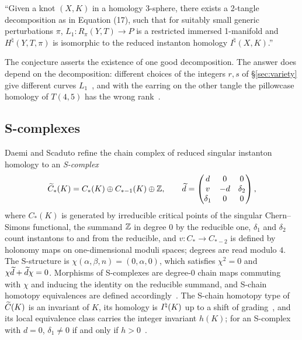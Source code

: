 \begin{conjecture}\label{conj:hhk65}
``Given a knot $(X,K)$ in a homology 3-sphere, there exists a 2-tangle decomposition as in Equation (17),
such that for suitably small generic perturbations $\pi$, $L_1:R_\pi(Y,T)\to P$ is a restricted immersed
1-manifold and $H^\natural(Y,T,\pi)$ is isomorphic to the reduced instanton homology $I^\natural(X,K)$.''
\end{conjecture}

The conjecture asserts the existence of one good decomposition. The answer does depend on the
decomposition: different choices of the integers $r,s$ of \S\ref{sec:variety} give different curves
$L_1$~\cite[p.~55]{HHK2}, and with the earring on the other tangle the pillowcase homology of $T(4,5)$ has
the wrong rank~\cite[\S10.3]{CHKK}.

\subsection{S-complexes}\label{ss:scomplex}
Daemi and Scaduto refine the chain complex of reduced singular instanton homology to an
\emph{S-complex}~\cite[Def.~3.21, \S4.1]{DSEquiv}
\[
\widetilde C_*(K)=C_*(K)\oplus C_{*-1}(K)\oplus\mathbb{Z},\qquad
\widetilde d=\begin{pmatrix} d&0&0\\ v&-d&\delta_2\\ \delta_1&0&0\end{pmatrix},
\]
where $C_*(K)$ is generated by irreducible critical points of the singular Chern--Simons functional, the
summand $\mathbb{Z}$ in degree $0$ by the reducible one, $\delta_1$ and $\delta_2$ count instantons to and from the
reducible, and $v\colon C_*\to C_{*-2}$ is defined by holonomy maps on one-dimensional moduli spaces;
degrees are read modulo $4$. The S-structure is $\chi(\alpha,\beta,n)=(0,\alpha,0)$, which satisfies $\chi^2=0$
and $\chi\widetilde d+\widetilde d\chi=0$. Morphisms of S-complexes are degree-$0$ chain maps commuting with $\chi$ and
inducing the identity on the reducible summand, and S-chain homotopy equivalences are defined
accordingly~\cite[Defs.~3.28,~3.30]{DSEquiv}. The S-chain homotopy type of $\widetilde C(K)$ is an invariant of $K$, its
homology is $I^{\natural}(K)$ up to a shift of grading~\cite[Thm.~3.34, Thm.~8.9]{DSEquiv}, and its local
equivalence class carries the integer invariant $h(K)$; for an S-complex with $d=0$, $\delta_1\neq0$ if and
only if $h>0$~\cite[Prop.~4.15, Rem.~4.2]{DSEquiv}.

